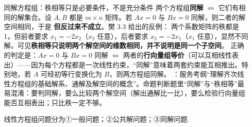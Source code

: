 \begin{fdeep}{同解方程组：秩相等只是必要条件，不是充分条件}
两个方程组\textbf{同解} $\iff$ 它们有相同的解集合。设 $A,B$ 都是 $m\times n$ 矩阵。若 $Ax=0$ 与 $Bx=0$ 同解，则二者的解空间相同，于是
\textbf{但反过来不成立}。樊 3.3 给出的反例：
两个系数矩阵的秩都是 1，但前者要求 $x_1=-2x_2$（$x_2$ 任意），后者要求 $x_2=-2x_1$（$x_1$ 任意），显然不同解。可见\textbf{秩相等只说明两个解空间的维数相同，并不说明是同一个子空间}。
正确的判定是：$Ax=0$ 与 $Bx=0$ 同解 $\iff$ 两者的\textbf{行向量组等价}（可以互相线性表出）——因为每个方程都是一次线性约束，“同解”意味着两套约束能互相推出。特别地，若 $A$ 可经初等行变换化为 $B$，则两方程组同解。
\fbref{}：服务考纲“理解齐次线性方程组的基础解系、通解及解空间的概念”。命题判断题里“同解”与“秩相等”最易混淆：要判同解，要么比较两个解空间（解出通解比一比），要么检验行向量组能否互相表出；只比秩一定不够。
\end{fdeep}


线性方程组问题分为①一般问题；②公共解问题；③同解问题.


